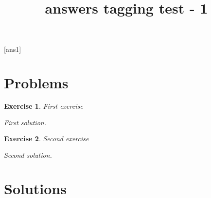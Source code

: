 \documentclass[12pt,a4paper]{article}
\title{answers tagging test - 1}
\newtheorem{ex}{Exercise}
\begin{document}
[ans1]
\section{Problems}
\begin{ex}
   First exercise
   \begin{sol}
      First solution.
   \end{sol}
\end{ex}
\begin{ex}
   Second exercise
   \begin{sol}
      Second solution.
   \end{sol}
\end{ex}
\section{Solutions}

\end{document}
